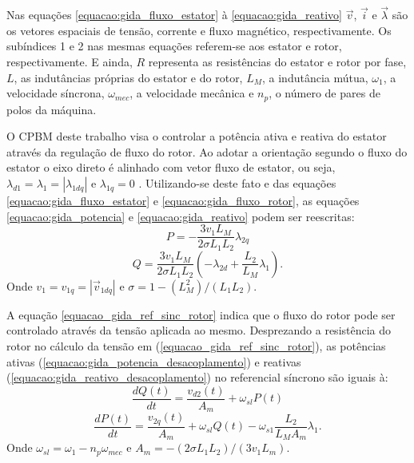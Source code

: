 	Nas equações \ref{equacao:gida_fluxo_estator} à \ref{equacao:gida_reativo} $\vec{v}$, $\vec{i}$ e $\vec{\lambda}$ são os vetores espaciais de tensão, corrente e fluxo magnético, respectivamente. Os subíndices 1 e 2 nas mesmas equações referem-se aos estator e rotor, respectivamente. E ainda, $R$ representa as resistências do estator e rotor por fase, $L$, as indutâncias próprias do estator e do rotor, $L_M$, a indutância mútua, $\omega_1$, a velocidade síncrona, $\omega_{mec}$, a velocidade mecânica e $n_p$, o número de pares de polos da máquina.
	
	O CPBM deste trabalho visa o controlar a potência ativa e reativa do estator através da regulação de fluxo do rotor. Ao adotar a orientação segundo o fluxo do estator o eixo direto é alinhado com vetor fluxo de estator, ou seja, $\lambda_{d1}=\lambda_1=|\lambda_{1dq}|$ e $\lambda_{1q}=0$ \cite{paperalfeu}. Utilizando-se deste fato e das equações \ref{equacao:gida_fluxo_estator} e \ref{equacao:gida_fluxo_rotor}, as equações \ref{equacao:gida_potencia} e \ref{equacao:gida_reativo} podem ser reescritas:
	\begin{equation}
		\label{equacao:gida_potencia_desacoplamento}
		P=-\frac{3v_1L_M}{2\sigma L_1L_2}\lambda_{2q}
	\end{equation}
	\begin{equation}
		\label{equacao:gida_reativo_desacoplamento}
		Q=\frac{3v_1L_M}{2\sigma L_1L_2}(-\lambda_{2d}+\frac{L_2}{L_M}\lambda_1).
	\end{equation}
	Onde  $v_1=v_{1q}=|\vec{v}_{1dq}|$ e $\sigma=1-(L_M^2)/(L_1L_2)$.
	
	A equação \ref{equacao_gida_ref_sinc_rotor} indica que o fluxo do rotor pode ser controlado através da tensão aplicada ao mesmo. Desprezando a resistência do rotor no cálculo da tensão em (\ref{equacao_gida_ref_sinc_rotor}), as potências ativas (\ref{equacao:gida_potencia_desacoplamento}) e reativas (\ref{equacao:gida_reativo_desacoplamento}) no referencial síncrono são iguais à:
	\begin{equation}
		\label{equacao:gida_reat_R}
		\frac{dQ(t)}{dt}=\frac{v_{d2}(t)}{A_m}+\omega_{sl}P(t)		
	\end{equation}
	\begin{equation}
		\label{equacao:gida_pot_R}
		\frac{dP(t)}{dt}=\frac{v_{2q}(t)}{A_m}+\omega_{sl}Q(t)-\omega_{s1}\frac{L_2}{L_MA_m}\lambda_1.
	\end{equation}
	Onde $\omega_{sl}=\omega_1-n_p\omega_{mec}$ e $A_m=-(2\sigma L_1L_2)/(3v_1L_m)$.
	
